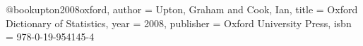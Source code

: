 @book{upton2008oxford,
	author    = {Upton, Graham and Cook, Ian},
	title     = {Oxford Dictionary of Statistics},
	year      = {2008},
	publisher = {Oxford University Press},
	isbn      = {978-0-19-954145-4}
}
